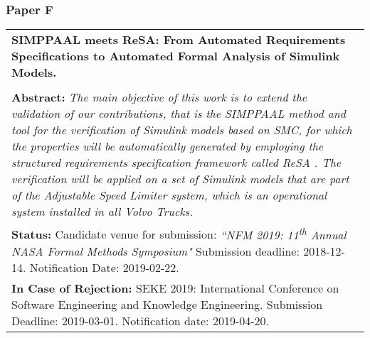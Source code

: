 \subsubsection{Paper F}
\begin{tabular}{p{\textwidth}}
\noindent \textbf{SIMPPAAL meets ReSA: From Automated Requirements Specifications to Automated Formal Analysis of Simulink Models.}\\%
\\[6pt]%
\noindent \textbf{Abstract:} \textit{The main objective of this work is to extend the validation of our contributions, that is the SIMPPAAL method and tool \cite{Filipovikj4714} for the verification of Simulink models based on SMC, for which the properties will be automatically generated by employing the structured requirements specification framework called ReSA \cite{resatool}. The verification will be applied on a set of Simulink models that are part of the Adjustable Speed Limiter system, which is an operational system installed in all Volvo Trucks.}\\[6pt]%
\textbf{Status: }Candidate venue for submission: \textit{``NFM 2019: 11\textsuperscript{th} Annual NASA Formal Methods Symposium"} Submission deadline: 2018-12-14. Notification Date: 2019-02-22.\\%
\textbf{In Case of Rejection: }SEKE 2019: International Conference on Software Engineering and Knowledge Engineering. Submission Deadline: 2019-03-01. Notification date: 2019-04-20.\\%
\end{tabular}

